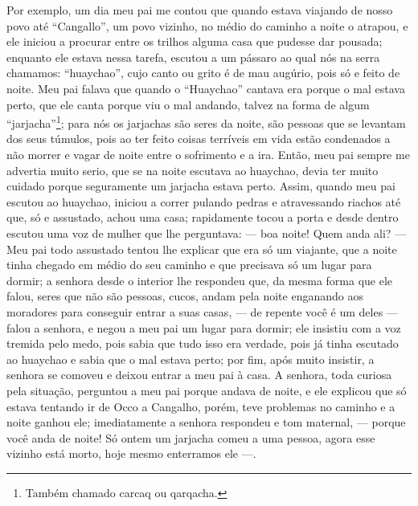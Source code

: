 Por exemplo, um dia meu pai me contou que quando estava viajando de nosso povo até ``Cangallo'', um povo vizinho, no médio do caminho a noite o atrapou, e ele iniciou a procurar entre os trilhos alguma casa que pudesse dar pousada; enquanto ele estava nessa tarefa, escutou a um pássaro ao qual nós na serra chamamos: ``huaychao'', cujo canto ou grito é de mau augúrio, pois só e feito de noite.
Meu pai falava que quando o ``Huaychao'' cantava era porque o mal estava perto, que ele canta porque viu o mal andando, talvez na forma de algum ``jarjacha''\footnote{Também chamado carcaq ou qarqacha.}; para nós os jarjachas são seres da noite, são pessoas que se levantam dos seus túmulos, pois ao ter feito coisas terríveis em vida estão condenados a não morrer e vagar de noite entre o sofrimento e a ira. 
Então, meu pai sempre me advertia muito serio, que se na noite escutava ao huaychao, devia ter muito cuidado porque seguramente um jarjacha estava perto. 
Assim, quando meu pai escutou ao huaychao, iniciou a correr pulando pedras e atravessando riachos até que, só e assustado, achou uma casa; rapidamente tocou a porta e desde dentro escutou uma voz de mulher que lhe perguntava: --- boa noite! Quem anda ali? ---
Meu pai todo assustado tentou lhe explicar que era só um viajante, que a noite tinha chegado em médio do seu caminho e que precisava só um lugar para dormir; a senhora desde o interior lhe respondeu que, da mesma forma que ele falou, seres que não são pessoas, cucos, andam pela noite enganando aos moradores para conseguir entrar a suas casas, --- de repente você é um deles --- falou a senhora, e negou a meu pai um lugar para dormir; ele insistiu com a voz tremida pelo medo, pois  sabia que tudo isso era verdade, pois já tinha escutado ao huaychao e sabia que o mal estava perto; por fim, após muito insistir, a senhora se comoveu e deixou entrar a meu pai à casa. 
A senhora, toda curiosa pela situação, perguntou a meu pai porque andava de noite, e ele explicou que só estava tentando ir de Occo a Cangalho, porém, teve problemas no caminho e a noite ganhou ele; imediatamente a senhora respondeu e tom maternal, --- porque você anda de noite! Só ontem um jarjacha comeu a uma pessoa, agora esse vizinho está morto, hoje mesmo enterramos ele ---.

